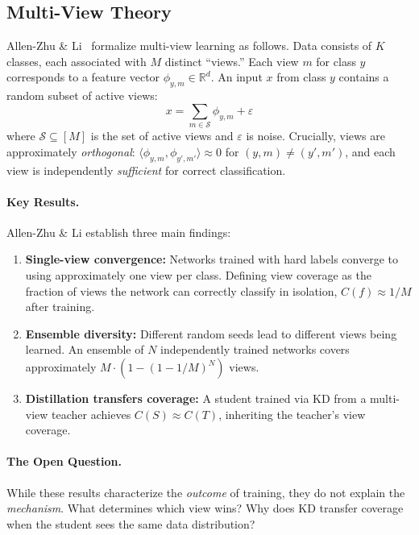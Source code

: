 \documentclass{article}
\newcommand{\R}{\mathbb{R}}
\newcommand{\cS}{\mathcal{S}}
\begin{document}
\subsection{Multi-View Theory}
\label{sec:multiview}

Allen-Zhu \& Li~\cite{allen2023towards} formalize multi-view learning as follows. Data consists of $K$ classes, each associated with $M$ distinct ``views.'' Each view $m$ for class $y$ corresponds to a feature vector $\phi_{y,m} \in \R^d$. An input $x$ from class $y$ contains a random subset of active views:
\begin{equation}
    x = \sum_{m \in \cS} \phi_{y,m} + \varepsilon
\end{equation}
where $\cS \subseteq [M]$ is the set of active views and $\varepsilon$ is noise. Crucially, views are approximately \emph{orthogonal}: $\langle \phi_{y,m}, \phi_{y',m'} \rangle \approx 0$ for $(y,m) \neq (y',m')$, and each view is independently \emph{sufficient} for correct classification.

\paragraph{Key Results.} Allen-Zhu \& Li establish three main findings:
\begin{enumerate}
    \item \textbf{Single-view convergence:} Networks trained with hard labels converge to using approximately one view per class. Defining view coverage as the fraction of views the network can correctly classify in isolation, $C(f) \approx 1/M$ after training.

    \item \textbf{Ensemble diversity:} Different random seeds lead to different views being learned. An ensemble of $N$ independently trained networks covers approximately $M \cdot (1 - (1-1/M)^N)$ views.

    \item \textbf{Distillation transfers coverage:} A student trained via KD from a multi-view teacher achieves $C(S) \approx C(T)$, inheriting the teacher's view coverage.
\end{enumerate}

\paragraph{The Open Question.} While these results characterize the \emph{outcome} of training, they do not explain the \emph{mechanism}. What determines which view wins? Why does KD transfer coverage when the student sees the same data distribution?
\end{document}
